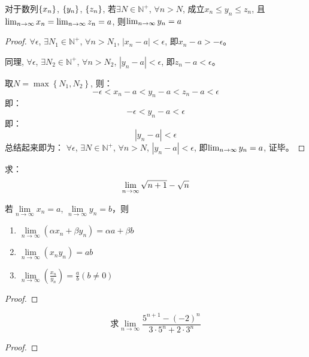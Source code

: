 \documentclass[lang=cn]{elegantbook}
\begin{document}
\begin{theorem}[数列极限的夹逼性定理]
    对于数列$\left\{ x_n\right\}$, $\left\{ y_n\right\}$, $\left\{ z_n\right\}$, 若$\exists N \in \mathbb{N}^+$, $\forall n > N$, 成立$x_n \le y_n \le z_n$, 且$\lim_{n \to \infty } x_n = \lim_{n \to \infty } z_n = a$, 则$\lim_{n \to \infty } y_n = a$
\end{theorem}
\begin{proof}
    $\forall \epsilon$, $\exists N_1 \in \mathbb{N}^+$, $\forall n > N_1$, $\left| x_n - a\right| < \epsilon$, 即$x_n -a > -\epsilon$。

    同理, $\forall \epsilon$, $\exists N_2 \in \mathbb{N}^+$, $\forall n > N_2$, $\left| y_n - a\right| < \epsilon$, 即$z_n -a < \epsilon$。

    取$N = \max\left\{ N_1, N_2 \right\}$, 则：
    \[ -\epsilon < x_n - a < y_n - a < z_n - a < \epsilon \]
    即：
    \[ -\epsilon < y_n - a <\epsilon \]
    即：
    \[ \left| y_n - a \right| < \epsilon \]
    总结起来即为：
    $\forall \epsilon$, $\exists N \in \mathbb{N}^+$, $\forall n > N$, $\left| y_n - a\right| < \epsilon$, 即$\lim_{n \to \infty } y_n = a$, 证毕。
\end{proof}
\begin{proposition}
    求：
    \[ \lim_{n \to \infty } \sqrt{n+1} - \sqrt{n}\]
\end{proposition}
\begin{theorem}[数列极限的四则运算]
    若$\lim\limits_{n \to \infty} x_n = a$, $\lim\limits_{n \to \infty} y_n = b$，则
    \begin{enumerate}
        \item $\lim\limits_{n \to \infty}(\alpha x_n + \beta y_n) = \alpha a + \beta b$
        \item $\lim\limits_{n \to \infty}(x_n y_n) = ab$
        \item $\lim\limits_{n \to \infty}(\frac{x_n}{y_n}) = \frac{a}{b}(b \neq 0)$
    \end{enumerate}
\end{theorem}
\begin{proof}
    
\end{proof}

\begin{proposition}
    \[\text{求} \lim\limits_{n \to \infty} \frac{5^{n+1}-(-2)^n}{3 \cdot 5^n + 2\cdot 3^n} \]
\end{proposition}
\begin{proof}
    
\end{proof}
\end{document}
